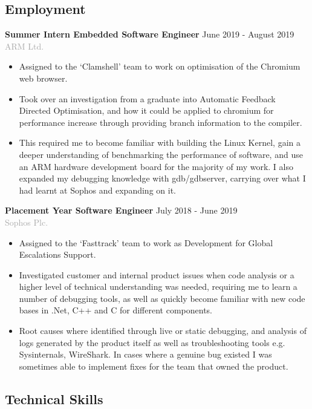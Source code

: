 \documentclass[11pt]{article}
\newcommand{\dash}{\item[-]}
\newcommand{\linesep}{\noindent\makebox[\linewidth]{\rule{\linewidth}{0.2pt}}}
\begin{document}
 \subsection*{Employment}
\textbf{Summer Intern Embedded Software Engineer} \hfill June 2019 - August 2019 \\
\textcolor{darkgray}{ARM Ltd.}
  \begin{itemize}
   \dash Assigned to the ‘Clamshell’ team to work on optimisation of the Chromium web browser.
   \dash Took over an investigation from a graduate into Automatic Feedback Directed Optimisation, and how it could be applied to chromium for performance increase through providing branch information to the compiler.
   \dash This required me to become familiar with building the Linux Kernel, gain a deeper understanding of benchmarking the performance of software, and use an ARM hardware development board for the majority of my work. I also expanded my debugging knowledge with gdb/gdbserver, carrying over what I had learnt at Sophos and expanding on it.
  \end{itemize}
\vspace{10pt}
\textbf{Placement Year Software Engineer} \hfill July 2018 - June 2019 \\
\textcolor{darkgray}{Sophos Plc.}
  \begin{itemize}
   \dash Assigned to the ‘Fasttrack’ team to work as Development for Global Escalations Support.
   \dash Investigated customer and internal product issues when code analysis or a higher level of technical understanding was needed, requiring me to learn a number of debugging tools, as well as quickly become familiar with new code bases in .Net, C++ and C for different components.
   \dash Root causes where identified through live or static debugging, and analysis of logs generated by the product itself as well as troubleshooting tools e.g. Sysinternals, WireShark. In cases where a genuine bug existed I was sometimes able to implement fixes for the team that owned the product.
  \end{itemize}

  \linesep

  \subsection*{Technical Skills}
   \renewcommand\tabularxcolumn[1]{b{#1}}%
\end{document}
